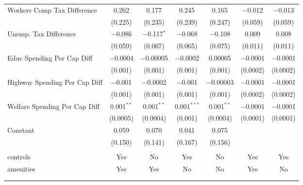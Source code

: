 \begin{table}[!htbp]
\begin{tabular}{@{\extracolsep{5pt}}lcccccc}
  Workers Comp Tax Difference & 0.262 & 0.177 & 0.245 & 0.165 & $-$0.012 & $-$0.013 \\ 
  & (0.225) & (0.235) & (0.239) & (0.247) & (0.059) & (0.059) \\ 
  Unemp. Tax Difference & $-$0.086 & $-$0.117$^{*}$ & $-$0.068 & $-$0.108 & 0.009 & 0.008 \\ 
  & (0.059) & (0.067) & (0.065) & (0.075) & (0.011) & (0.011) \\ 
  Educ Spending Per Cap Diff & $-$0.0004 & $-$0.00005 & $-$0.0002 & 0.00005 & $-$0.0001 & $-$0.0001 \\ 
  & (0.001) & (0.001) & (0.001) & (0.001) & (0.0002) & (0.0002) \\ 
  Highway Spending Per Cap Diff & $-$0.001 & $-$0.0002 & $-$0.001 & $-$0.00003 & $-$0.0001 & $-$0.0001 \\ 
  & (0.001) & (0.001) & (0.001) & (0.001) & (0.0002) & (0.0002) \\ 
  Welfare Spending Per Cap Diff & 0.001$^{**}$ & 0.001$^{**}$ & 0.001$^{***}$ & 0.001$^{**}$ & $-$0.0001 & $-$0.0001 \\ 
  & (0.0005) & (0.0004) & (0.001) & (0.0004) & (0.0001) & (0.0001) \\ 
  Constant & 0.059 & 0.070 & 0.041 & 0.075 &  &  \\ 
  & (0.150) & (0.141) & (0.167) & (0.156) &  &  \\ 
 \hline \\[-1.8ex] 
controls & Yes & No & Yes & No & Yes & Yes \\ 
amenities & Yes & Yes & No & No & Yes & No \\ 
\hline \\[-1.8ex] 
\hline 
\hline \\[-1.8ex] 
\end{tabular} 
\end{table} 

